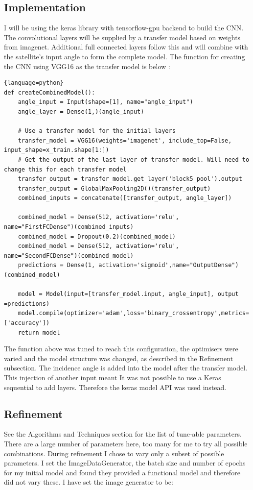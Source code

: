 \documentclass{article}
\begin{document}
\subsection{Implementation}
I will be using the keras library with tensorflow-gpu backend to build the CNN. The convolutional layers will be supplied by a transfer model based on weights from imagenet. Additional full connected layers follow this and will combine with the satellite's input angle to form the complete model. The function for creating the CNN using VGG16 as the transfer model is below \cite{angle-inject-kernel}:
\begin{lstlisting}{language=python}
def createCombinedModel():
    angle_input = Input(shape=[1], name="angle_input")
    angle_layer = Dense(1,)(angle_input)
    
    # Use a transfer model for the initial layers
    transfer_model = VGG16(weights='imagenet', include_top=False, input_shape=x_train.shape[1:])
    # Get the output of the last layer of transfer model. Will need to change this for each transfer model
    transfer_output = transfer_model.get_layer('block5_pool').output
    transfer_output = GlobalMaxPooling2D()(transfer_output)
    combined_inputs = concatenate([transfer_output, angle_layer])
    
    combined_model = Dense(512, activation='relu', name="FirstFCDense")(combined_inputs)
    combined_model = Dropout(0.2)(combined_model)
    combined_model = Dense(512, activation='relu', name="SecondFCDense")(combined_model)
    predictions = Dense(1, activation='sigmoid',name="OutputDense")(combined_model)
    
    model = Model(input=[transfer_model.input, angle_input], output =predictions)
    model.compile(optimizer='adam',loss='binary_crossentropy',metrics=['accuracy'])
    return model
\end{lstlisting}
The function above was tuned to reach this configuration, the optimisers were varied and the model structure was changed, as described in the Refinement subsection. The incidence angle is added into the model after the transfer model. This injection of another input meant It was not possible to use a Keras sequential to add layers. Therefore the keras model API was used instead. 
\subsection{Refinement}
See the Algorithms and Techniques section for the list of tune-able parameters. There are a large number of parameters here, too many for me to try all possible combinations. During refinement I chose to vary only a subset of possible parameters. I set the ImageDataGenerator, the batch size and number of epochs for my initial model and found they provided a functional model and therefore did not vary these.  
I have set the image generator to be:
\end{document}
